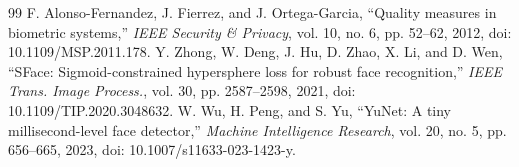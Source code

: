 \documentclass[10pt,lettersize,journal]{IEEEtran}
\begin{document}
\begin{thebibliography}{99}
 F. Alonso-Fernandez, J. Fierrez, and J. Ortega-Garcia, ``Quality measures in biometric systems,'' \textit{IEEE Security \& Privacy}, vol. 10, no. 6, pp. 52--62, 2012, doi: 10.1109/MSP.2011.178.
 Y. Zhong, W. Deng, J. Hu, D. Zhao, X. Li, and D. Wen, ``SFace: Sigmoid-constrained hypersphere loss for robust face recognition,'' \textit{IEEE Trans. Image Process.}, vol. 30, pp. 2587--2598, 2021, doi: 10.1109/TIP.2020.3048632.
 W. Wu, H. Peng, and S. Yu, ``YuNet: A tiny millisecond-level face detector,'' \textit{Machine Intelligence Research}, vol. 20, no. 5, pp. 656--665, 2023, doi: 10.1007/s11633-023-1423-y.
\end{thebibliography}

\end{document}
